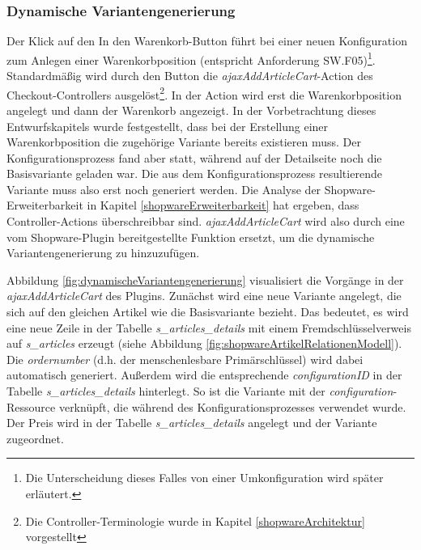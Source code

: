\documentclass[11pt, a4paper, titlepage, listof=totoc, bibliography=totoc, index=totoc, twoside, openright, headings=normal]{scrreprt}
\begin{document}
\subsubsection*{Dynamische Variantengenerierung}
Der Klick auf den \glqq In den Warenkorb\grqq{}-Button führt bei einer neuen Konfiguration zum Anlegen einer Warenkorbposition (entspricht Anforderung SW.F05)\footnote{Die Unterscheidung dieses Falles von einer Umkonfiguration wird später erläutert.}.  Standardmäßig wird durch den Button die \emph{ajaxAddArticleCart}-Action des Checkout-Controllers ausgelöst\footnote{Die Controller-Terminologie wurde in Kapitel \ref{shopwareArchitektur} vorgestellt}. In der Action wird erst die Warenkorbposition angelegt und dann der Warenkorb angezeigt. In der Vorbetrachtung dieses Entwurfskapitels wurde festgestellt, dass bei der Erstellung einer Warenkorbposition die zugehörige Variante bereits existieren muss. Der Konfigurationsprozess fand aber statt, während auf der Detailseite noch die Basisvariante geladen war. Die aus dem Konfigurationsprozess resultierende Variante muss also erst noch generiert werden. Die Analyse der Shopware-Erweiterbarkeit in Kapitel \ref{shopwareErweiterbarkeit} hat ergeben, dass Controller-Actions überschreibbar sind. \emph{ajaxAddArticleCart} wird also durch eine vom Shopware-Plugin bereitgestellte Funktion ersetzt, um die dynamische Variantengenerierung zu hinzuzufügen.

Abbildung \ref{fig:dynamischeVariantengenerierung} visualisiert die Vorgänge in der \emph{ajaxAddArticleCart} des Plugins. Zunächst wird eine neue Variante angelegt, die sich auf den gleichen Artikel wie die Basisvariante bezieht. Das bedeutet, es wird eine neue Zeile in der Tabelle \emph{s\_articles\_details} mit einem Fremdschlüsselverweis auf \emph{s\_articles} erzeugt (siehe Abbildung \ref{fig:shopwareArtikelRelationenModell}). Die \emph{ordernumber} (d.h. der menschenlesbare Primärschlüssel) wird dabei automatisch generiert. Außerdem wird die entsprechende \emph{configurationID} in der Tabelle \emph{s\_articles\_details} hinterlegt. So ist die Variante mit der \emph{configuration}-Ressource verknüpft, die während des Konfigurationsprozesses verwendet wurde. Der Preis wird in der Tabelle \emph{s\_articles\_details} angelegt und der Variante zugeordnet.
\end{document}
